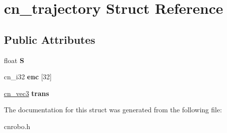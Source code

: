 \hypertarget{structcn__trajectory}{\section{cn\-\_\-trajectory Struct Reference}
\label{structcn__trajectory}
}
\subsection*{Public Attributes}
\begin{DoxyCompactItemize}
\item 
\hypertarget{structcn__trajectory_a7fbeafd99f110e03628778d4e75d17d5}{float {\bfseries S}}\label{structcn__trajectory_a7fbeafd99f110e03628778d4e75d17d5}

\item 
\hypertarget{structcn__trajectory_ade558abb9665772483d2ecc5c9e5bb8f}{cn\-\_\-i32 {\bfseries enc} \mbox{[}32\mbox{]}}\label{structcn__trajectory_ade558abb9665772483d2ecc5c9e5bb8f}

\item 
\hypertarget{structcn__trajectory_a2dfa1493cf16d182de347eb4b224729e}{\hyperlink{structcn__vec3}{cn\-\_\-vec3} {\bfseries trans}}\label{structcn__trajectory_a2dfa1493cf16d182de347eb4b224729e}

\end{DoxyCompactItemize}


The documentation for this struct was generated from the following file\-:\begin{DoxyCompactItemize}
\item 
cnrobo.\-h\end{DoxyCompactItemize}
